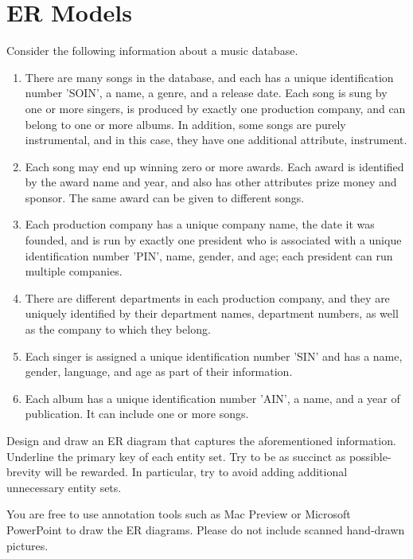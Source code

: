 \documentclass[paper=a4, fontsize=11pt]{scrartcl}
\numberwithin{equation}{section}		%
\numberwithin{figure}{section}			%
\numberwithin{table}{section}				%
\begin{document}
\section{ER Models}
Consider the following information about a music database.

\begin{enumerate}
\item There are many songs in the database, and each has a unique identification number 'SOIN', a name, a genre, and a release date. Each song is sung by one or more singers, is produced by exactly one production company, and can belong to one or more albums. In addition, some songs are purely instrumental, and in this case, they have one additional attribute, instrument.
\item Each song may end up winning zero or more awards. Each award is identified by the award name and year, and also has other attributes prize money and sponsor. The same award can be given to different songs.
\item Each production company has a unique company name, the date it was founded, and is run by exactly one president who is associated with a unique identification number 'PIN', name, gender, and age; each president can run multiple companies.
\item There are different departments in each production company, and they are uniquely identified by their department names, department numbers, as well as the company to which they belong.
\item Each singer is assigned a unique identification number 'SIN' and has a name, gender, language, and age as part of their information.
\item Each album has a unique identification number 'AIN', a name, and a year of publication. It can include one or more songs.
\end{enumerate}

Design and draw an ER diagram that captures the aforementioned information. Underline the primary key of each entity set. Try to be as succinct as possible-brevity will be rewarded. In particular, try to avoid adding additional unnecessary entity sets.

You are free to use annotation tools such as Mac Preview or Microsoft PowerPoint to draw the ER diagrams. Please do not include scanned hand-drawn pictures.\\
\\
\end{document}
